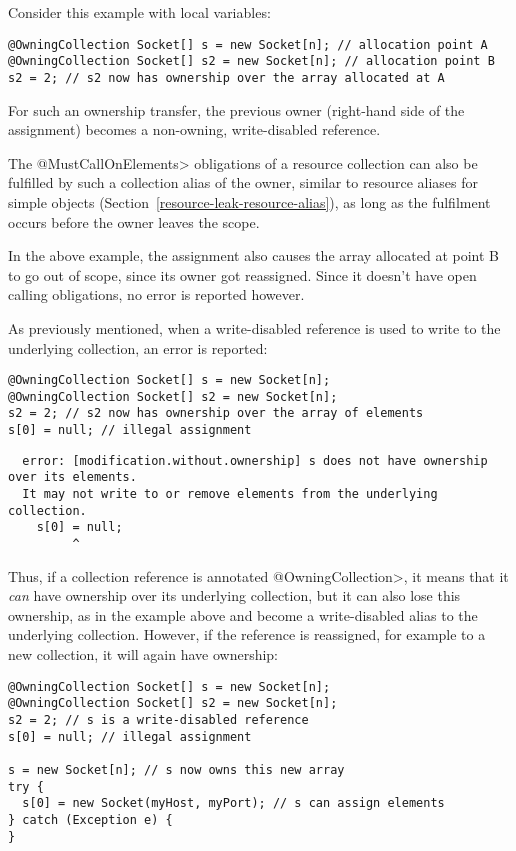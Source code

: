 Consider this example with local variables:

\begin{Verbatim}
@OwningCollection Socket[] s = new Socket[n]; // allocation point A
@OwningCollection Socket[] s2 = new Socket[n]; // allocation point B
s2 = 2; // s2 now has ownership over the array allocated at A
\end{Verbatim}

For such an ownership transfer, the previous owner (right-hand side of the assignment) becomes a non-owning, write-disabled reference.

The \<@MustCallOnElements> obligations of a resource collection can also be fulfilled by such a collection alias of the owner, similar to resource aliases for simple objects (Section~\ref{resource-leak-resource-alias}), as long as the fulfilment occurs before the owner leaves the scope.

In the above example, the assignment also causes the array allocated at point B to go out of scope, since its owner got reassigned. Since it doesn't have open calling obligations, no error is reported however.

As previously mentioned, when a write-disabled reference is used to write to the underlying collection, an error is reported:

\begin{Verbatim}
@OwningCollection Socket[] s = new Socket[n];
@OwningCollection Socket[] s2 = new Socket[n];
s2 = 2; // s2 now has ownership over the array of elements
s[0] = null; // illegal assignment
\end{Verbatim}

\begin{Verbatim}
  error: [modification.without.ownership] s does not have ownership over its elements.
  It may not write to or remove elements from the underlying collection.
    s[0] = null;
         ^
\end{Verbatim}

Thus, if a collection reference is annotated \<@OwningCollection>, it means that it \textit{can} have ownership over its underlying collection, but it can also lose this ownership, as in the example above and become a write-disabled alias to the underlying collection.
However, if the reference is reassigned, for example to a new collection, it will again have ownership:

\begin{verbatim}
@OwningCollection Socket[] s = new Socket[n];
@OwningCollection Socket[] s2 = new Socket[n];
s2 = 2; // s is a write-disabled reference
s[0] = null; // illegal assignment

s = new Socket[n]; // s now owns this new array
try {
  s[0] = new Socket(myHost, myPort); // s can assign elements
} catch (Exception e) {
}
\end{verbatim}

